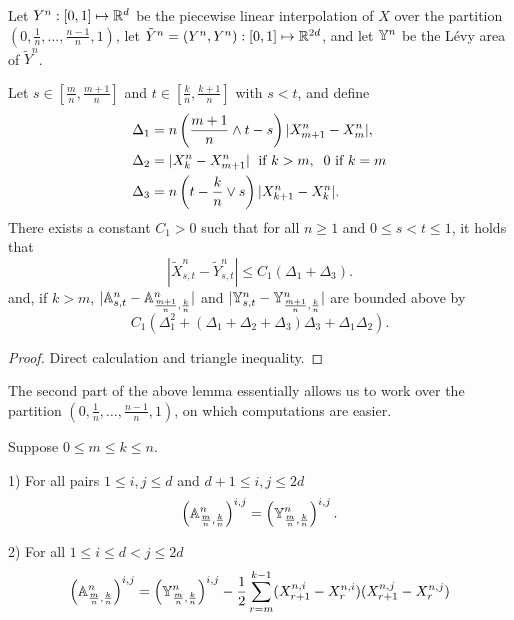 \documentclass{article}
\begin{document}
Let $Y^n : [0,1] \mapsto \mathbb R^{d}$ be the piecewise linear interpolation of $X$ over the partition $\left(0, \frac{1}{n}, \ldots, \frac{n-1}{n}, 1\right)$, let $\tilde Y^n = (Y^n,Y^n) : [0,1] \mapsto \mathbb R^{2d}$,
and let $\mathbb Y^n$ be the L{\'e}vy area of $\tilde Y^n$.


\begin{lemma}\label{lem:XYDiff}
Let $s \in [\frac{m}{n},\frac{m+1}{n}]$ and $t \in [\frac{k}{n}, \frac{k+1}{n}]$ with $s < t$, and define
\begin{align*}
\Delta_1 &= n\left(\frac{m+1}{n} \wedge t - s \right) |X^n_{m+1} - X^n_m|, \\
\Delta_2 &= |X^n_k - X^n_{m+1}| \; \textnormal{ if $k > m$}, \; \; 0 \textnormal{ if  $k= m$} \\
\Delta_3 &= n\left(t-\frac{k}{n}\vee s\right)|X^n_{k+1} - X^n_k|.
\end{align*}
There exists a constant $C_1 > 0$ such that for all $n \geq 1$ and $0 \leq s < t \leq 1$, it holds that
\[
|\tilde X^n_{s,t} - \tilde Y^n_{s,t}| \leq C_1\left( \Delta_1 + \Delta_3 \right).
\]
and, if $k > m$, $|\mathbb A^n_{s,t} - \mathbb A^n_{\frac{m+1}{n}, \frac{k}{n}}|$ and $|\mathbb Y^n_{s,t} - \mathbb Y^n_{\frac{m+1}{n}, \frac{k}{n}}|$ are bounded above by
\[
C_1 \left(\Delta_1^2 + (\Delta_1+ \Delta_2 + \Delta_3)\Delta_3 + \Delta_1 \Delta_2 \right).
\]
\end{lemma}

\begin{proof}
Direct calculation and triangle inequality.
\end{proof}

The second part of the above lemma essentially allows us to work over the partition $\left(0, \frac{1}{n}, \ldots, \frac{n-1}{n}, 1\right)$, on which computations are easier.

\begin{lemma}\label{lem:partitionPoints}
Suppose $0 \leq m \leq k \leq n$.

1) For all pairs $1 \leq i,j \leq d$ and $d+1 \leq i,j \leq 2d$
\[
\left(\mathbb A^n_{\frac{m}{n}, \frac{k}{n}}\right)^{i,j} = \left(\mathbb Y^n_{\frac{m}{n}, \frac{k}{n}}\right)^{i,j}.
\]

2) For all $1 \leq i \leq d < j \leq 2d$
\[
\left(\mathbb A^n_{\frac{m}{n}, \frac{k}{n}}\right)^{i,j} = \left(\mathbb Y^n_{\frac{m}{n}, \frac{k}{n}}\right)^{i,j} - \frac{1}{2} \sum_{r=m}^{k-1} (X^{n,i}_{r+1}-X^{n,i}_r)(X^{n,j}_{r+1}-X^{n,j}_r)
\]
\end{lemma}
\end{document}
